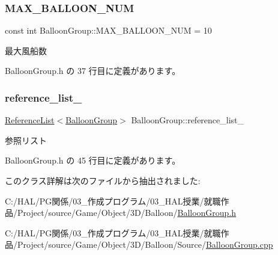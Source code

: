 \mbox{\label{class_balloon_group_abc53b845e436f62dc4f5899b83d1b029}} 
\subsubsection{\texorpdfstring{M\+A\+X\+\_\+\+B\+A\+L\+L\+O\+O\+N\+\_\+\+N\+UM}{MAX\_BALLOON\_NUM}}
{\footnotesize\ttfamily const int Balloon\+Group\+::\+M\+A\+X\+\_\+\+B\+A\+L\+L\+O\+O\+N\+\_\+\+N\+UM = 10\hspace{0.3cm}{\ttfamily [static]}}



最大風船数 



 Balloon\+Group.\+h の 37 行目に定義があります。

\mbox{\label{class_balloon_group_a5734f227201920a38dd0379fce5b2ee8}} 
\subsubsection{\texorpdfstring{reference\+\_\+list\+\_\+}{reference\_list\_}}
{\footnotesize\ttfamily \mbox{\hyperlink{class_reference_list}{Reference\+List}}$<$\mbox{\hyperlink{class_balloon_group}{Balloon\+Group}}$>$ Balloon\+Group\+::reference\+\_\+list\+\_\+\hspace{0.3cm}{\ttfamily [private]}}



参照リスト 



 Balloon\+Group.\+h の 45 行目に定義があります。



このクラス詳解は次のファイルから抽出されました\+:\begin{DoxyCompactItemize}
\item 
C\+:/\+H\+A\+L/\+P\+G関係/03\+\_\+作成プログラム/03\+\_\+\+H\+A\+L授業/就職作品/\+Project/source/\+Game/\+Object/3\+D/\+Balloon/\mbox{\hyperlink{_balloon_group_8h}{Balloon\+Group.\+h}}\item 
C\+:/\+H\+A\+L/\+P\+G関係/03\+\_\+作成プログラム/03\+\_\+\+H\+A\+L授業/就職作品/\+Project/source/\+Game/\+Object/3\+D/\+Balloon/\+Source/\mbox{\hyperlink{_balloon_group_8cpp}{Balloon\+Group.\+cpp}}\end{DoxyCompactItemize}
